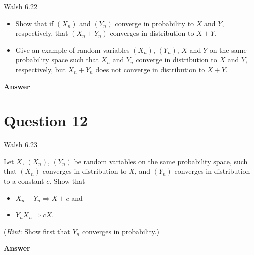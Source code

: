 \documentclass[letterpaper]{article}
\begin{document}
		{\color{deepred} Walsh 6.22}
		
		\begin{itemize}
			\item[(a)] Show that if $(X_n)$ and $(Y_n)$ converge in probability to $X$ and $Y$, respectively, that $(X_n + Y_n)$ converges in distribution to $X + Y$.
			\item[(b)] Give an example of random variables $(X_n)$, $(Y_n)$, $X$ and $Y$ on the same probability space such that $X_n$ and $Y_n$ converge in distribution to $X$ and $Y$, respectively, but $X_n + Y_n$ does not converge in distribution to $X + Y$.
		\end{itemize}
		
		
		\textbf{Answer}
		
		\clearpage
		
		\section{Question 12}
		
		{\color{deepred} Walsh 6.23}
		
		Let $X$, $(X_n)$, $(Y_n)$ be random variables on the same probability space, such that $(X_n)$ converges in distribution to $X$, and $(Y_n)$ converges in distribution to a constant $c$. Show that
		\begin{itemize}
			\item[(a)] $X_n + Y_n \Longrightarrow X + c$ and
			\item[(b)] $Y_n X_n \Longrightarrow cX$.
		\end{itemize}
		(\emph{Hint}: Show first that $Y_n$ converges in probability.)
		
		\textbf{Answer}
		
		
	
\end{document}
